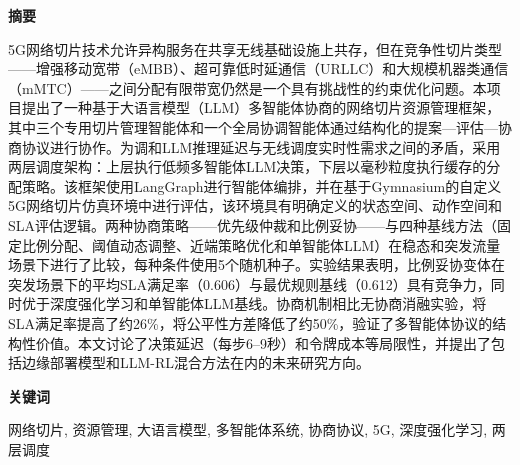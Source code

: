 \onehalfspacing
{\fontsize{16pt}{30pt}\selectfont \noindent\textbf{摘要}}
\vspace{0.7cm}
{\fontsize{12pt}{18pt}\selectfont

5G网络切片技术允许异构服务在共享无线基础设施上共存，但在竞争性切片类型——增强移动宽带（eMBB）、超可靠低时延通信（URLLC）和大规模机器类通信（mMTC）——之间分配有限带宽仍然是一个具有挑战性的约束优化问题。本项目提出了一种基于大语言模型（LLM）多智能体协商的网络切片资源管理框架，其中三个专用切片管理智能体和一个全局协调智能体通过结构化的提案—评估—协商协议进行协作。为调和LLM推理延迟与无线调度实时性需求之间的矛盾，采用两层调度架构：上层执行低频多智能体LLM决策，下层以毫秒粒度执行缓存的分配策略。该框架使用LangGraph进行智能体编排，并在基于Gymnasium的自定义5G网络切片仿真环境中进行评估，该环境具有明确定义的状态空间、动作空间和SLA评估逻辑。两种协商策略——优先级仲裁和比例妥协——与四种基线方法（固定比例分配、阈值动态调整、近端策略优化和单智能体LLM）在稳态和突发流量场景下进行了比较，每种条件使用5个随机种子。实验结果表明，比例妥协变体在突发场景下的平均SLA满足率（0.606）与最优规则基线（0.612）具有竞争力，同时优于深度强化学习和单智能体LLM基线。协商机制相比无协商消融实验，将SLA满足率提高了约26\%，将公平性方差降低了约50\%，验证了多智能体协议的结构性价值。本文讨论了决策延迟（每步6--9秒）和令牌成本等局限性，并提出了包括边缘部署模型和LLM-RL混合方法在内的未来研究方向。

}
\vspace{1.0cm}
{\fontsize{16pt}{30pt}\selectfont \noindent\textbf{关键词}}
\vspace{0.7cm}
{\fontsize{12pt}{18pt}\selectfont

网络切片, 资源管理, 大语言模型, 多智能体系统, 协商协议, 5G, 深度强化学习, 两层调度

}

